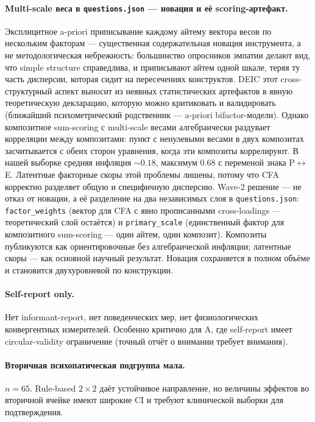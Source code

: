 \paragraph{Multi-scale веса в \texttt{questions.json} --- новация и её scoring-артефакт.} Эксплицитное a-priori приписывание каждому айтему вектора весов по нескольким факторам --- существенная содержательная новация инструмента, а не методологическая небрежность: большинство опросников эмпатии делают вид, что simple structure справедлива, и приписывают айтем одной шкале, теряя ту часть дисперсии, которая сидит на пересечениях конструктов. DEIC этот cross-структурный аспект выносит из неявных статистических артефактов в явную теоретическую декларацию, которую можно критиковать и валидировать (ближайший психометрический родственник --- a-priori bifactor-модели). Однако композитное sum-scoring с multi-scale весами алгебраически раздувает корреляции между композитами: пункт с ненулевыми весами в двух композитах засчитывается с обеих сторон уравнения, когда эти композиты коррелируют. В нашей выборке средняя инфляция $\sim 0.18$, максимум $0.68$ с переменой знака P$\leftrightarrow$E. Латентные факторные скоры этой проблемы лишены, потому что CFA корректно разделяет общую и специфичную дисперсию. Wave-2 решение --- не отказ от новации, а её разделение на два независимых слоя в \texttt{questions.json}: \texttt{factor\_weights} (вектор для CFA с явно прописанными cross-loadings --- теоретический слой остаётся) и \texttt{primary\_scale} (единственный фактор для композитного sum-scoring --- один айтем, один композит). Композиты публикуются как ориентировочные без алгебраической инфляции; латентные скоры --- как основной научный результат. Новация сохраняется в полном объёме и становится двухуровневой по конструкции.

\paragraph{Self-report only.} Нет informant-report, нет поведенческих мер, нет физиологических конвергентных измерителей. Особенно критично для A, где self-report имеет circular-validity ограничение (точный отчёт о внимании требует внимания).

\paragraph{Вторичная психопатическая подгруппа мала.} $n = 65$. Rule-based $2 \times 2$ даёт устойчивое направление, но величины эффектов во вторичной ячейке имеют широкие CI и требуют клинической выборки для подтверждения.

